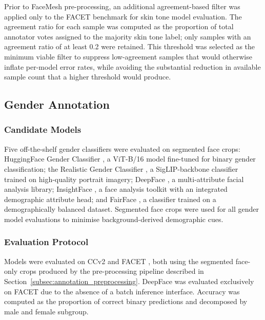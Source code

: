 Prior to FaceMesh pre-processing, an additional agreement-based filter was applied only to the FACET benchmark \cite{Gustafson_2023_FACET} for skin tone model evaluation. The agreement ratio for each sample was computed as the proportion of total annotator votes assigned to the majority skin tone label; only samples with an agreement ratio of at least 0.2 were retained. This threshold was selected as the minimum viable filter to suppress low-agreement samples that would otherwise inflate per-model error rates, while avoiding the substantial reduction in available sample count that a higher threshold would produce.

\subsection{Gender Annotation}
\label{subsec:gender_annotation}

\subsubsection{Candidate Models}
\label{subsubsec:gender_candidates}

Five off-the-shelf gender classifiers were evaluated on segmented face crops: HuggingFace Gender Classifier \cite{Rizvandwiki_2023_HuggingFaceGenderClassification}, a ViT-B/16 model fine-tuned for binary gender classification; the Realistic Gender Classifier \cite{Tschannen_2025_SigLIP2_RealisticGenderClassifier}, a SigLIP-backbone classifier trained on high-quality portrait imagery; DeepFace \cite{Serengil_2021_HyperExtendedLightFace_DeepFace}, a multi-attribute facial analysis library; InsightFace \cite{Deng_2022_ArcFace_InsightFace}, a face analysis toolkit with an integrated demographic attribute head; and FairFace \cite{Karkkainen_2021_FairFace}, a classifier trained on a demographically balanced dataset. Segmented face crops were used for all gender model evaluations to minimise background-derived demographic cues.

\subsubsection{Evaluation Protocol}
\label{subsubsec:gender_eval}

Models were evaluated on CCv2 \cite{Porgali_2023_CCv2} and FACET \cite{Gustafson_2023_FACET}, both using the segmented face-only crops produced by the pre-processing pipeline described in Section~\ref{subsec:annotation_preprocessing}. DeepFace was evaluated exclusively on FACET due to the absence of a batch inference interface. Accuracy was computed as the proportion of correct binary predictions and decomposed by male and female subgroup.

